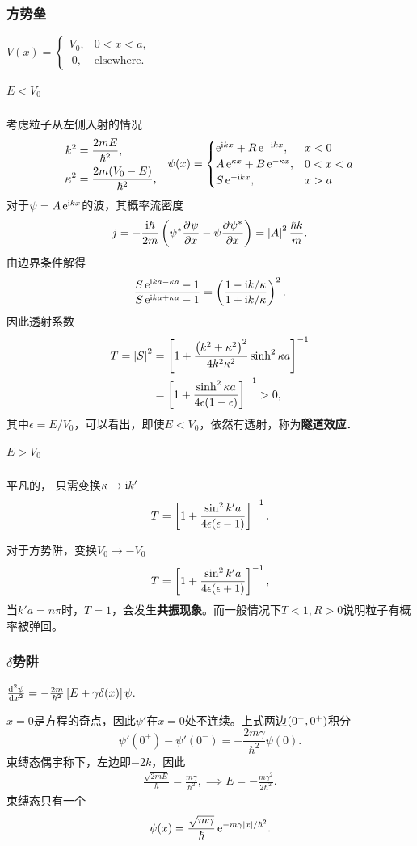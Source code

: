 \subsubsection*{方势垒}
\begin{center}
	$V(x)=\begin{cases}
			V_0, & 0<x<a,            \\
			~0,  & \text{elsewhere.}
		\end{cases}$
\end{center}
\subparagraph*{$E<V_0$}考虑粒子从左侧入射的情况
\begin{align*}
	\begin{aligned}
		k^2      & =\frac{2mE}{\hbar^2},       \\
		\kappa^2 & =\frac{2m(V_0-E)}{\hbar^2},
	\end{aligned}\quad
	\psi(x)=\begin{cases}
		\e{\i kx}+R\e{-\i kx},        & x<0   \\
		A\e{\kappa x}+B\e{-\kappa x}, & 0<x<a \\
		S\e{-\i kx},                  & x>a
	\end{cases}
\end{align*}
对于$\psi=A\e{\i kx}$的波，其概率流密度
\[
	j=-\frac{\i\hbar}{2m}\kh{\psi^*\pv\psi{x}-\psi\pv{\psi^*}x}=\abs{A}^2\frac{\hbar k}m.
\]
由边界条件解得
\[
	\frac{S\e{\i ka-\kappa a}-1}{S\e{\i ka+\kappa a}-1}=\kh{\frac{1-\i k/\kappa}{1+\i k/\kappa}}^2.
\]
因此透射系数
\begin{align}\notag
	T=\abs{S}^2 & =\fkh{1+\frac{\kh{k^2+\kappa^2}^2}{4k^2\kappa^2}\sinh^2\kappa a}^{-1} \\
	            & =\fkh{1+\frac{\sinh^2\kappa a}{4\epsilon(1-\epsilon)}}^{-1}>0,
\end{align}
其中$\epsilon=E/V_0$，可以看出，即使$E<V_0$，依然有透射，称为\textbf{隧道效应}．
\subparagraph*{$E>V_0$}平凡的，
只需变换$\kappa\to\i k'$
\[
	T=\fkh{1+\frac{\sin^2k'a}{4\epsilon(\epsilon-1)}}^{-1}.
\]

对于方势阱，变换$V_0\to-V_0$
\[
	T=\fkh{1+\frac{\sin^2k'a}{4\epsilon(\epsilon+1)}}^{-1},
\]
当$k'a=n\pi$时，$T=1$，会发生\textbf{共振现象}。而一般情况下$T<1,R>0$说明粒子有概率被弹回。
\subsubsection*{$\delta$势阱}
\begin{center}
	$\dv[2]\psi{x}=-\frac{2m}{\hbar^2}\fkh{E+\gamma\delta(x)}\psi.$
\end{center}
$x=0$是方程的奇点，因此$\psi'$在$x=0$处不连续。上式两边$\kh{0^-,0^+}$积分
\[
	\psi'(0^+)-\psi'(0^-)=-\frac{2m\gamma}{\hbar^2}\psi(0).
\]
束缚态偶宇称下，左边即$-2k$，因此
\begin{align}
	\frac{\sqrt{2mE}}\hbar=\frac{m\gamma}{\hbar^2},\implies E=-\frac{m\gamma^2}{2\hbar^2}.
\end{align}
束缚态只有一个
\begin{align}
	\psi(x)=\frac{\sqrt{m\gamma}}\hbar\e{-m\gamma\abs{x}/\hbar^2}.
\end{align}
